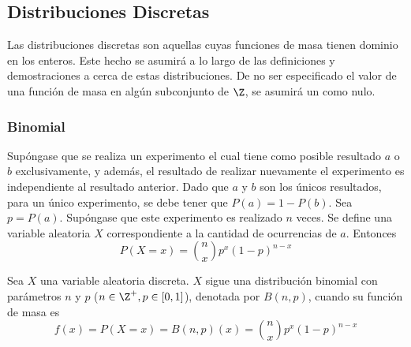 \subsection{Distribuciones Discretas}
Las distribuciones discretas son aquellas cuyas funciones de masa tienen
dominio en los enteros. Este hecho se asumirá a lo largo de
las definiciones y demostraciones a cerca de estas distribuciones.
De no ser especificado el valor de una función de masa en algún
subconjunto de $\Z$, se asumirá un como nulo.

\subsubsection{Binomial}
\label{dist:binom}
Supóngase que se realiza un experimento el cual tiene como posible
resultado $a$ o $b$ exclusivamente, y además, el resultado
de realizar nuevamente el experimento es independiente al
resultado anterior. Dado que $a$ y $b$ son los únicos resultados,
para un único experimento, se debe tener que
$P(a) = 1 - P(b)$. Sea $p=P(a)$. Supóngase que
este experimento es realizado $n$ veces. Se define una variable
aleatoria $X$ correspondiente a la cantidad de ocurrencias de $a$.
Entonces
\[P(X=x) = \binom{n}{x}p^x(1-p)^{n-x}\]
\begin{Def}
  Sea $X$ una variable aleatoria discreta. $X$ sigue una distribución
  binomial con parámetros $n$ y $p$ ($n\in\Z^+, p\in[0,1]$), denotada por $B(n,p)$,
  cuando su función de masa es
  \[f(x) = P(X=x) = B(n,p)(x) = \binom{n}{x}p^x(1-p)^{n-x}\]
\end{Def}

